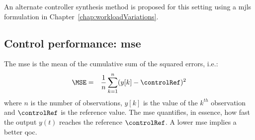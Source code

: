 An alternate controller synthesis method is proposed for this setting using a \gls{mjls} formulation in Chapter~\ref{chap:workloadVariations}.

\subsection{Control performance: \acrfull{mse}}
\label{sec:ch5_MSE}
The \gls{mse} is the mean of the cumulative sum of the squared errors, i.e.:
\begin{eqnarray}
     \MSE &=& \frac{1}{n}\sum_{k=1}^{n}(y[k] - \controlRef)^2 \nonumber
	\label{eqn:ch5_MSE}
\end{eqnarray}
\noindent where $n$ is the number of observations, $y[k]$ is the value of the $k^{th}$ observation and $\controlRef$ is the reference value. 
The \gls{mse} quantifies, in essence, how fast the output $y(t)$ reaches the reference $\controlRef$.  
A lower \gls{mse} implies a better \gls{qoc}.